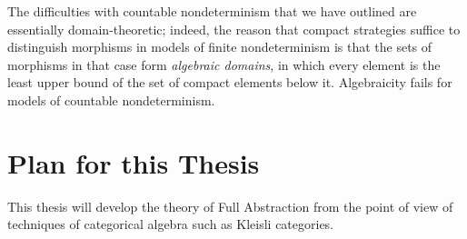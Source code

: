 The difficulties with countable nondeterminism that we have outlined are essentially domain-theoretic; indeed, the reason that compact strategies suffice to distinguish morphisms in models of finite nondeterminism is that the sets of morphisms in that case form \emph{algebraic domains}, in which every element is the least upper bound of the set of compact elements below it.  
Algebraicity fails for models of countable nondeterminism.

\section{Plan for this Thesis}

This thesis will develop the theory of Full Abstraction from the point of view of techniques of categorical algebra such as Kleisli categories.

